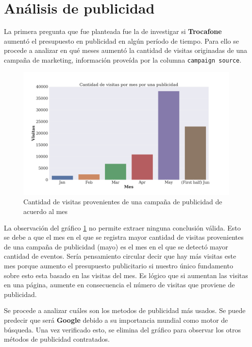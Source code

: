 \documentclass[a4paper]{article}
\begin{document}
\section{Análisis de publicidad}

La primera pregunta que fue planteada fue la de investigar si \textbf{Trocafone} aumentó el presupuesto en publicidad en algún período de tiempo. Para ello se procede a analizar en qué meses aumentó la cantidad de visitas originadas de una campaña de marketing, información proveída por la columna \texttt{campaign source}.

\begin{figure}[!h]
	\includegraphics[width=\linewidth]{figures/16-presupuesto-barplot.png}
	\caption{Cantidad de visitas provenientes de una campaña de publicidad de acuerdo al mes}
	\label{fig:publicidad}
\end{figure}

\newpage

La observación del gráfico \ref{fig:publicidad} no permite extraer ninguna conclusión válida. Esto se debe a que el mes en el que se registra mayor cantidad de visitas provenientes de una campaña de publicidad (mayo) es el mes en el que se detectó mayor cantidad de eventos. Sería pensamiento circular decir que hay más visitas este mes porque aumento el presupuesto publicitario si nuestro único fundamento sobre esto esta basado en las visitas del mes. Es lógico que si aumentan las visitas en una página, aumente en consecuencia el número de visitas que proviene de publicidad.

Se procede a analizar cuáles son los metodos de publicidad más usados. Se puede predecir que será \textbf{Google} debido a su importancia mundial como motor de búsqueda. Una vez verificado esto, se elimina del gráfico para observar los otros métodos de publicidad contratados.
\end{document}
